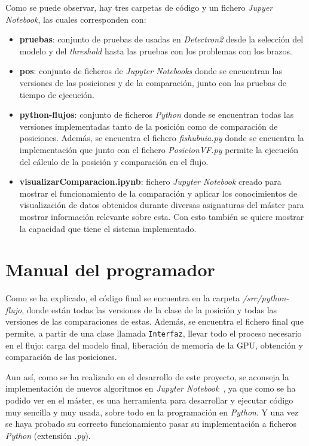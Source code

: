 Como se puede observar, hay tres carpetas de código y un fichero \textit{Jupyer Notebook}, las cuales corresponden con:
\begin{itemize}
	\item \textbf{pruebas}: conjunto de pruebas de usadas en \textit{Detectron2} desde la selección del modelo y del \textit{threshold} hasta las pruebas con los problemas con los brazos.
	\item \textbf{pos}: conjunto de ficheros de \textit{Jupyter Notebooks} donde se encuentran las versiones de las posiciones y de la comparación, junto con las pruebas de tiempo de ejecución.
	\item \textbf{python-flujos}: conjunto de ficheros \textit{Python} donde se encuentran todas las versiones implementadas tanto de la posición como de comparación de posiciones. Además, se encuentra el fichero \textit{fishubuia.py} donde se encuentra la implementación que junto con el fichero \textit{PosicionVF.py} permite la ejecución del cálculo de la posición y comparación en el flujo.
	\item \textbf{visualizarComparacion.ipynb}: fichero \textit{Jupyter Notebook} creado para mostrar el funcionamiento de la comparación y aplicar los conocimientos de visualización de datos obtenidos durante diversas asignaturas del máster para mostrar información relevante sobre esta. Con esto también se quiere mostrar la capacidad que tiene el sistema implementado.
\end{itemize}

\section{Manual del programador}
Como se ha explicado, el código final se encuentra en la carpeta \textit{/src/python-flujo}, donde están todas las versiones de la clase de la posición y todas las versiones de las comparaciones de estas. Además, se encuentra el fichero final que permite, a partir de una clase llamada \texttt{Interfaz}, llevar todo el proceso necesario en el flujo: carga del modelo final, liberación de memoria de la GPU, obtención y comparación de las posiciones.

Aun así, como se ha realizado en el desarrollo de este proyecto, se aconseja la implementación de nuevos algoritmos en \textit{Jupyter Notebook}~\cite{Kluyver:2016aa}, ya que como se ha podido ver en el máster, es una herramienta para desarrollar y ejecutar código muy sencilla y muy usada, sobre todo en la programación en \textit{Python}. Y una vez se haya probado su correcto funcionamiento pasar su implementación a ficheros \textit{Python} (extensión \textit{.py}).

